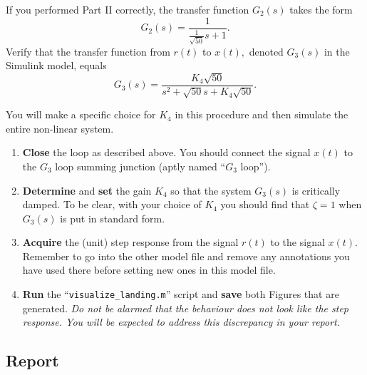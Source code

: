 %
If you performed Part II correctly, the transfer function \(G_2(s)\) takes the
form
\[
  G_2(s) = \frac{1}{\frac{1}{\sqrt{50}}s + 1}.
\]
Verify that the transfer function from \(r(t)\) to \(x(t),\) denoted \(G_3(s)\) in the Simulink model, equals
\[
  G_3(s) = \frac{K_4\sqrt{50}}{s^2 + \sqrt{50} s + K_4 \sqrt{50}}.
\]
%
\begin{procedure}[label={proc:lab3:regulate}]
  You will make a specific choice for \(K_4\) in this procedure and then simulate the entire non-linear system.
  \begin{enumerate}[label={(\arabic*)}]
    \item{%
      \textbf{Close} the loop as described above.
      You should connect the signal \(x(t)\) to the \(G_3\) loop summing junction (aptly named ``\(G_3\) loop'').%
    }
    \item{%
      \textbf{Determine} and \textbf{set} the gain \(K_4\) so that the system \(G_3(s)\) is critically damped.
      To be clear, with your choice of \(K_4\) you should find that \(\zeta = 1\) when \(G_3(s)\) is put in standard form.%
    }
    \item{%
      \textbf{Acquire} the (unit) step response from the signal \(r(t)\) to the signal \(x(t).\)
      Remember to go into the other model file and remove any annotations you have used there before setting new ones in this model file.%
    }
    \item{%
      \textbf{Run} the ``\texttt{visualize\_landing.m}'' script and \textbf{save} both Figures that are generated.%
      \emph{Do not be alarmed that the behaviour does not look like the step response. You will be expected to address this discrepancy in your report.}
    }
  \end{enumerate}
\end{procedure}
%

\subsection{Report}

